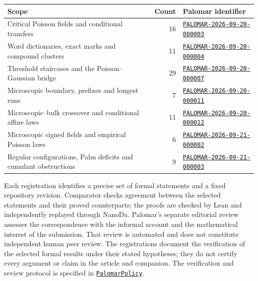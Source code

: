 \begin{center}
\small
\setlength{\tabcolsep}{4pt}
\renewcommand{\arraystretch}{1.12}
\begin{tabularx}{\textwidth}{@{}>{\raggedright\arraybackslash}X r l@{}}
\toprule
\textbf{Scope} & \textbf{Count} & \textbf{Palomar identifier} \\
\midrule
Critical Poisson fields and conditional transfers & 16 &
\href{https://palomar-registry.org/entry?id=PALOMAR-2026-09-20-000003\&version=1}{\texttt{PALOMAR-2026-09-20-000003}} \\
Word dictionaries, exact marks and compound clusters & 11 &
\href{https://palomar-registry.org/entry?id=PALOMAR-2026-09-20-000004\&version=1}{\texttt{PALOMAR-2026-09-20-000004}} \\
Threshold staircases and the Poisson--Gaussian bridge & 29 &
\href{https://palomar-registry.org/entry?id=PALOMAR-2026-09-20-000007\&version=1}{\texttt{PALOMAR-2026-09-20-000007}} \\
Microscopic boundary, prefixes and longest runs & 7 &
\href{https://palomar-registry.org/entry?id=PALOMAR-2026-09-20-000011\&version=1}{\texttt{PALOMAR-2026-09-20-000011}} \\
Microscopic--bulk crossover and conditional affine laws & 11 &
\href{https://palomar-registry.org/entry?id=PALOMAR-2026-09-20-000012\&version=1}{\texttt{PALOMAR-2026-09-20-000012}} \\
Microscopic signed fields and empirical Poisson laws & 6 &
\href{https://palomar-registry.org/entry?id=PALOMAR-2026-09-21-000002\&version=1}{\texttt{PALOMAR-2026-09-21-000002}} \\
Regular configurations, Palm deficits and cumulant obstructions & 9 &
\href{https://palomar-registry.org/entry?id=PALOMAR-2026-09-21-000003\&version=1}{\texttt{PALOMAR-2026-09-21-000003}} \\
\bottomrule
\end{tabularx}
\end{center}

Each registration identifies a precise set of formal statements and a fixed
repository revision. Comparator checks agreement between the selected statements
and their proved counterparts; the proofs are checked by Lean and independently
replayed through NanoDa. Palomar's separate editorial review assesses the
correspondence with the informal account and the mathematical interest of the
submission. That review is automated and does not constitute independent human
peer review. The registrations document the verification of the selected formal
results under their stated hypotheses; they do not certify every argument or
claim in the article and companion. The verification and review protocol is
specified in
\href{https://github.com/PalomarRegistry/PalomarPolicy/blob/main/docs/specification.md}{\texttt{PalomarPolicy}}.
